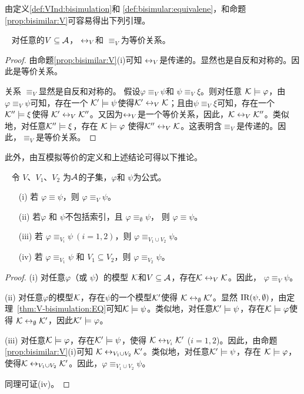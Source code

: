 由定义\ref{def:VInd:bisimulation}和 \ref{def:bisimular:equivalene}，和命题\ref{prop:bisimilar:V}可容易得出下列引理。
\begin{lemma}~\label{lem:eqR}
	对任意的$V\subseteq\cal A$，  $\leftrightarrow_V$和 $\equiv_V$为等价关系。
\end{lemma}
\begin{proof}
	由命题\ref{prop:bisimilar:V}(i)可知 $\leftrightarrow_V$是传递的。显然也是自反和对称的。因此是等价关系。
	
	关系 $\equiv_V$显然是自反和对称的。
	假设$\varphi\equiv_V\psi$和 $\psi\equiv_V\xi$。则对任意 ${\cal K}\models\varphi$，由$\varphi\equiv_V\psi$可知，存在一个 ${\cal K}'\models\psi$使得${\cal K}'\leftrightarrow_V{\cal K}$；且由$\psi\equiv_V\xi$可知，存在一个 ${\cal K}''\models\xi$使得
	${\cal K}'\leftrightarrow_V{\cal K}''$。又因为$\leftrightarrow_V$是一个等价关系，因此，${\cal K}\leftrightarrow_V{\cal K}''$。类似地，对任意${\cal K}''\models\xi$，存在 ${\cal K}\models \varphi$ 使得${\cal K}''\leftrightarrow_V{\cal K}$。这表明含$\equiv_V$是传递的。因此，$\equiv_V$是等价关系。
\end{proof} 

此外，由互模拟等价的定义和上述结论可得以下推论。%
\begin{corollary}~\label{cor:eqbi}
	令 $V$、$V_1$、$V_2$ 为$\cal A$的子集，$\varphi$和 $\psi$为公式。
	\begin{itemize}
		\item[(i)] 若 $\varphi\equiv\psi$，则 $\varphi\equiv_V\psi$。
		\item[(ii)] 若$\varphi$ 和 $\psi$不包括索引，且 $\varphi\equiv_\emptyset\psi$， 则 $\varphi\equiv\psi$。
		\item[(iii)] 若 $\varphi\equiv_{V_i}\psi~(i=1,2)$，则 $\varphi\equiv_{V_1\cup V_2}\psi$。
		\item[(iv)] 若 $\varphi\equiv_{V_1}\psi$ 和 $V_1\subseteq V_2$，则 $\varphi\equiv_{V_2}\psi$。
	\end{itemize}
\end{corollary}
\begin{proof}
	(i) 对任意$\varphi$（或 $\psi$）的模型 ${\cal K}$和$V \subseteq {\cal A}$，存在${\cal K} \leftrightarrow_V {\cal K}$。因此， $\varphi\equiv_V\psi$。
	
	(ii) 对任意$\varphi$的模型${\cal K}$，存在$\psi$的一个模型${\cal K}'$使得 ${\cal K} \leftrightarrow_{\emptyset} {\cal K}'$。显然 $\textrm{IR}(\psi, \emptyset)$，由定理~\ref{thm:V-bisimulation:EQ}可知${\cal K} \models \psi$。类似地，对任意${\cal K}' \models \psi$，存在${\cal K} \models \varphi$使得 ${\cal K} \leftrightarrow_{\emptyset} {\cal K}'$，因此${\cal K}'\models \varphi$。
	
	(iii) 对任意${\cal K} \models \varphi$，存在${\cal K}' \models \psi$，使得 ${\cal K} \leftrightarrow_{V_i} {\cal K}'$ ($i=1,2$)。因此，由命题\ref{prop:bisimilar:V}(i)可知 ${\cal K} \leftrightarrow_{V_1\cup V_2} {\cal K}'$。类似地，对任意${\cal K}' \models \psi$，存在 ${\cal K} \models \varphi$，使得${\cal K} \leftrightarrow_{V_1\cup V_2} {\cal K}'$。因此，$\varphi\equiv_{V_1\cup V_2}\psi$。
	
	同理可证(iv)。
\end{proof}

